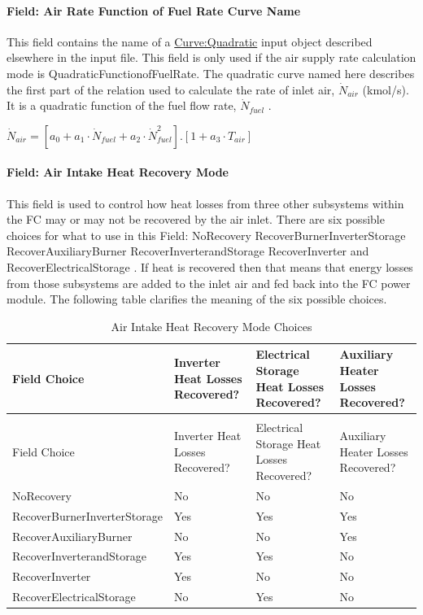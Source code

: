 \paragraph{Field: Air Rate Function of Fuel Rate Curve Name}\label{field-air-rate-function-of-fuel-rate-curve-name}

This field contains the name of a \hyperref[curvequadratic]{Curve:Quadratic} input object described elsewhere in the input file. This field is only used if the air supply rate calculation mode is QuadraticFunctionofFuelRate. The quadratic curve named here describes the first part of the relation used to calculate the rate of inlet air, \({\dot N_{air}}\) (kmol/s). It is a quadratic function of the fuel flow rate, \({\dot N_{fuel}}\) .

 \({\dot N_{air}} = \left[ {{a_0} + {a_1} \cdot {{\dot N}_{fuel}} + {a_2} \cdot \dot N_{fuel}^2} \right].\left[ {1 + {a_3} \cdot {T_{air}}} \right]\)

\paragraph{Field: Air Intake Heat Recovery Mode}\label{field-air-intake-heat-recovery-mode}

This field is used to control how heat losses from three other subsystems within the FC may or may not be recovered by the air inlet. There are six possible choices for what to use in this Field: NoRecovery RecoverBurnerInverterStorage RecoverAuxiliaryBurner RecoverInverterandStorage RecoverInverter and RecoverElectricalStorage . If heat is recovered then that means that energy losses from those subsystems are added to the inlet air and fed back into the FC power module. The following table clarifies the meaning of the six possible choices.

\begin{longtable}[c]{p{1.5in}p{1.5in}p{1.5in}p{1.5in}}
\caption{Air Intake Heat Recovery Mode Choices \label{table:air-intake-heat-recovery-mode-choices}} \tabularnewline
\toprule
Field Choice & Inverter Heat Losses Recovered? & Electrical Storage Heat Losses Recovered? & Auxiliary Heater Losses Recovered? \tabularnewline
\midrule
\endfirsthead

\caption[]{Air Intake Heat Recovery Mode Choices} \tabularnewline
\toprule
Field Choice & Inverter Heat Losses Recovered? & Electrical Storage Heat Losses Recovered? & Auxiliary Heater Losses Recovered? \tabularnewline
\midrule
\endhead

NoRecovery & No & No & No \tabularnewline
RecoverBurnerInverterStorage & Yes & Yes & Yes \tabularnewline
RecoverAuxiliaryBurner & No & No & Yes \tabularnewline
RecoverInverterandStorage & Yes & Yes & No \tabularnewline
RecoverInverter & Yes & No & No \tabularnewline
RecoverElectricalStorage & No & Yes & No \tabularnewline
\bottomrule
\end{longtable}

